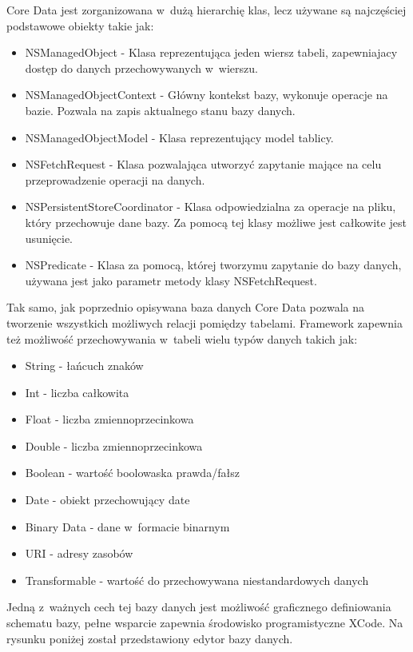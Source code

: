 Core Data jest zorganizowana w~dużą hierarchię klas, lecz używane są najczęściej podstawowe obiekty takie jak: 

\begin{itemize}
	\item NSManagedObject - Klasa reprezentująca jeden wiersz tabeli, zapewniajacy dostęp do danych przechowywanych w~wierszu.
	\item NSManagedObjectContext - Główny kontekst bazy, wykonuje operacje na bazie. Pozwala na zapis aktualnego stanu bazy danych.
	\item NSManagedObjectModel	- Klasa reprezentujący model tablicy. 
	\item NSFetchRequest - Klasa pozwalająca utworzyć zapytanie mające na celu przeprowadzenie operacji na danych.
	\item NSPersistentStoreCoordinator - Klasa odpowiedzialna za operacje na pliku, który przechowuje dane bazy. Za pomocą tej klasy możliwe jest całkowite jest usunięcie. 
	\item NSPredicate - Klasa za pomocą, której tworzymu zapytanie do bazy danych, używana jest jako parametr metody klasy NSFetchRequest.
\end{itemize}

Tak samo, jak poprzednio opisywana baza danych Core Data pozwala na tworzenie wszystkich możliwych relacji pomiędzy tabelami. Framework zapewnia też możliwość przechowywania w~tabeli wielu typów danych takich jak: 

\begin{itemize}
	\item String - łańcuch znaków
	\item Int - liczba całkowita
	\item Float - liczba zmiennoprzecinkowa
	\item Double  - liczba zmiennoprzecinkowa
	\item Boolean - wartość boolowaska prawda/fałsz 
	\item Date - obiekt przechowujący date
	\item Binary Data - dane w~formacie binarnym 
	\item URI - adresy zasobów
	\item Transformable - wartość do przechowywana niestandardowych danych 
\end{itemize}

Jedną z~ważnych cech tej bazy danych jest możliwość graficznego definiowania schematu bazy, pełne wsparcie zapewnia środowisko programistyczne XCode. Na rysunku  poniżej został przedstawiony edytor bazy danych. \par

